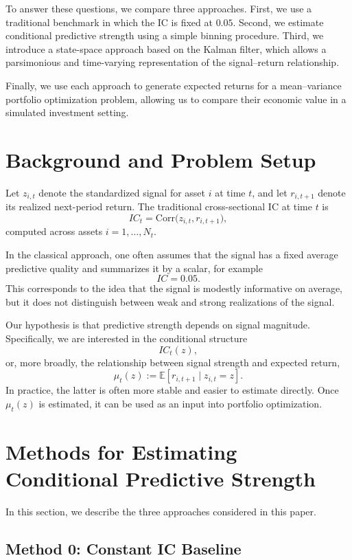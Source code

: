 \documentclass[11pt]{article}
\begin{document}
To answer these questions, we compare three approaches. First, we use a traditional benchmark in which the IC is fixed at $0.05$. Second, we estimate conditional predictive strength using a simple binning procedure. Third, we introduce a state-space approach based on the Kalman filter, which allows a parsimonious and time-varying representation of the signal--return relationship.

Finally, we use each approach to generate expected returns for a mean--variance portfolio optimization problem, allowing us to compare their economic value in a simulated investment setting.

\section{Background and Problem Setup}

Let $z_{i,t}$ denote the standardized signal for asset $i$ at time $t$, and let $r_{i,t+1}$ denote its realized next-period return. The traditional cross-sectional IC at time $t$ is
\[
IC_t = \mathrm{Corr}\big(z_{i,t}, r_{i,t+1}\big),
\]
computed across assets $i=1,\dots,N_t$.

In the classical approach, one often assumes that the signal has a fixed average predictive quality and summarizes it by a scalar, for example
\[
IC = 0.05.
\]
This corresponds to the idea that the signal is modestly informative on average, but it does not distinguish between weak and strong realizations of the signal.

Our hypothesis is that predictive strength depends on signal magnitude. Specifically, we are interested in the conditional structure
\[
IC_t(z),
\]
or, more broadly, the relationship between signal strength and expected return,
\[
\mu_t(z) := \mathbb{E}[r_{i,t+1}\mid z_{i,t}=z].
\]
In practice, the latter is often more stable and easier to estimate directly. Once $\mu_t(z)$ is estimated, it can be used as an input into portfolio optimization.

\section{Methods for Estimating Conditional Predictive Strength}

In this section, we describe the three approaches considered in this paper.

\subsection{Method 0: Constant IC Baseline}
\end{document}
